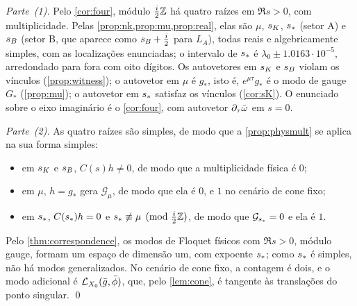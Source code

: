\emph{Parte~(1).} Pelo \cref{cor:four}, módulo $\tfrac i2\mathbb{Z}$ há quatro raízes em $\Re s>0$, com multiplicidade. Pelas
\cref{prop:nk,prop:mu,prop:real}, elas são $\mu$, $s_{K}$, $s_{\ast}$ (setor A) e $s_{B}$ (setor B, que aparece como
$s_{B}+\tfrac i2$ para $L_A$), todas reais e algebricamente simples, com as localizações enunciadas; o intervalo de
$s_{\ast}$ é $\lambda_0\pm1.0163\cdot10^{-5}$, arredondado para fora com oito dígitos. Os autovetores em $s_{K}$ e $s_{B}$ violam os vínculos
(\cref{prop:witness}); o autovetor em $\mu$ é $g_*$, isto é, $e^{\mu\tau}g_*$ é o modo de gauge $G_*$
(\cref{prop:mu}); o autovetor em $s_{\ast}$ satisfaz os vínculos (\cref{cor:sK}). O enunciado sobre o
eixo imaginário é o \cref{cor:four}, com autovetor $\partial_\tau\bar\omega$ em $s=0$.

\emph{Parte~(2).} As quatro raízes são simples, de modo que a \cref{prop:physmult} se aplica na sua forma simples:
\begin{itemize}[leftmargin=*]
\item em $s_{K}$ e $s_{B}$, $C(s)h\neq0$, de modo que a multiplicidade física é $0$;
\item em $\mu$, $h=g_*$ gera $\mathcal G_\mu$, de modo que ela é $0$, e $1$ no cenário de cone fixo;
\item em $s_{\ast}$, $C(s_{\ast})h=0$ e $s_{\ast}\not\equiv\mu\pmod{\tfrac i2\mathbb{Z}}$, de modo que $\mathcal G_{s_{\ast}}=0$ e ela é $1$.
\end{itemize}
Pelo \cref{thm:correspondence}, os modos de Floquet físicos com $\Re s>0$, módulo gauge, formam um espaço de dimensão um,
com expoente $s_{\ast}$; como $s_{\ast}$ é simples, não há modos generalizados. No cenário de cone fixo, a
contagem é dois, e o modo adicional é $\mathcal{L}_{X_0}(\bar g,\bar\phi)$, que, pelo \cref{lem:cone}, é tangente às
translações do ponto singular. \qed
